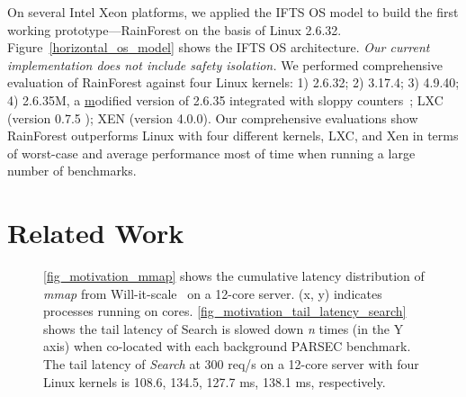 \documentclass[pageno]{jpaper}
\begin{document}
On several Intel Xeon platforms, we applied the IFTS OS model to build the first working prototype---RainForest on the basis of Linux 2.6.32. Figure~\ref{horizontal_os_model} shows the IFTS OS architecture.
\emph{Our current implementation does not include safety isolation.}
We performed comprehensive evaluation of RainForest against four Linux kernels: 1) 2.6.32; 2) 3.17.4; 3) 4.9.40; 4) 2.6.35M,
a \underline{m}odified version of 2.6.35 integrated with sloppy counters~\cite{Boyd-Wickizer:2010:MOSBench}; LXC (version 0.7.5 ); XEN (version 4.0.0).  Our comprehensive evaluations show RainForest outperforms Linux with four different kernels, LXC, and Xen in terms of worst-case and average performance most of time when running a large number of benchmarks.
























































 \section{Related Work}




\begin{figure*}[t]
\setlength{\abovecaptionskip}{0pt}
\setlength{\belowcaptionskip}{3pt}
    \centering
    \caption{\ref{fig_motivation_mmap} shows the cumulative latency distribution of \emph{mmap} from Will-it-scale~\cite{Will-It-Scale} on a 12-core server. (x, y) indicates  processes running on  cores.
\ref{fig_motivation_tail_latency_search} shows the tail latency of Search is slowed down \emph{n} times (in the Y axis) when co-located with each background PARSEC benchmark. The tail latency of \emph{Search} at 300 req/s on a 12-core server with four Linux kernels  is 108.6, 134.5, 127.7 ms, 138.1 ms, respectively.}
    \label{fig_motivation_tail_latency}
\end{figure*}
\end{document}
